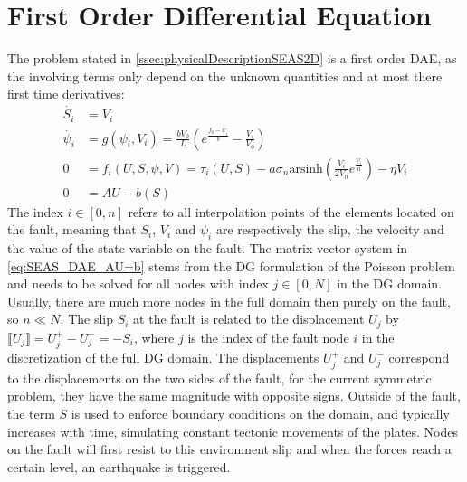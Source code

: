 \section{First Order Differential Equation}
The problem stated in \autoref{ssec:physicalDescriptionSEAS2D} is a first order DAE, as the involving terms only depend on the unknown quantities and at most there first time derivatives:
\begin{align}
    \dot{S_i} &= V_i \label{eq:SEASDAE_dV_dt} \\
	\dot{\psi_i} &= g(\psi_i, V_i) =\frac{bV_0}{L}\left(e^{\frac{f_0-\psi_i}{b}} - \frac{V_i}{V_0}\right) \label{eq:SEAS_DAE_ageing_law} \\
	0 &= f_i(U,S,\psi,V) = \tau_i(U,S) - a\sigma_n\text{arsinh}\left(\frac{V_i}{2V_0}e^{\frac{\psi_i}{a}}\right) -\eta V_i \label{eq:SEASDAE_frictionLaw}\\
    0 &= AU - b(S) \label{eq:SEAS_DAE_AU=b}  
\end{align}
The index $i\in[0,n]$ refers to all interpolation points of the elements located on the fault, meaning that $S_i$, $V_i$ and $\psi_i$ are respectively the slip, the velocity and the value of the state variable on the fault. The matrix-vector system in \autoref{eq:SEAS_DAE_AU=b} stems from the DG formulation of the Poisson problem and needs to be solved for all nodes with index $j\in[0,N]$ in the DG domain. Usually, there are much more nodes in the full domain then purely on the fault, so $n \ll N$. The slip $S_i$ at the fault is related to the displacement $U_j$ by $\llbracket U_j \rrbracket = U_j^+ - U_j^- = -S_i$, where $j$ is the index of the fault node $i$ in the discretization of the full DG domain. The displacements $U_j^+$ and $U_j^-$ correspond to the displacements on the two sides of the fault, for the current symmetric problem, they have the same magnitude with opposite signs. Outside of the fault, the term $S$ is used to enforce boundary conditions on the domain, and typically increases with time, simulating constant tectonic movements of the plates. Nodes on the fault will first resist to this environment slip and when the forces reach a certain level, an earthquake is triggered. \\
 

